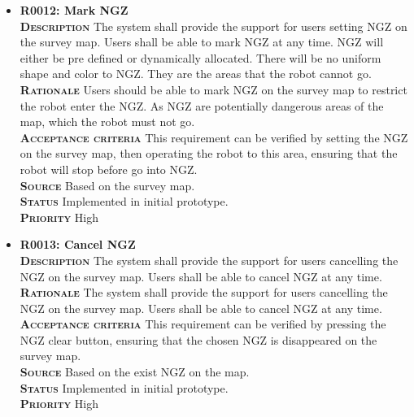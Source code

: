 \documentclass[11pt, a4paper]{article}
\begin{document}
\begin{itemize}
\item {\bfseries R0012: Mark NGZ}\\
\textsc{\bfseries Description} The system shall provide the support for users setting NGZ on the survey map. Users shall be able to mark NGZ at any time. NGZ will either be pre defined or dynamically allocated. There will be no uniform shape and color to NGZ. They are the areas that the robot cannot go. \\
\textsc{\bfseries Rationale} Users should be able to mark NGZ on the survey map to restrict the robot enter the NGZ. As NGZ are potentially dangerous areas of the map, which the robot must not go.\\
\textsc{\bfseries Acceptance criteria} This requirement can be verified by setting the NGZ on the survey map, then operating the robot to this area, ensuring that the robot will stop before go into NGZ.\\
\textsc{\bfseries Source} Based on the survey map.\\
\textsc{\bfseries Status} Implemented in initial prototype.\\
\textsc{\bfseries Priority} High\\

\item {\bfseries R0013: Cancel NGZ}\\
\textsc{\bfseries Description} The system shall provide the support for users cancelling the NGZ on the survey map. Users shall be able to cancel NGZ at any time.\\
\textsc{\bfseries Rationale} The system shall provide the support for users cancelling the NGZ on the survey map. Users shall be able to cancel NGZ at any time.\\
\textsc{\bfseries Acceptance criteria} This requirement can be verified by pressing the NGZ clear button, ensuring that the chosen NGZ is disappeared on the survey map.\\
\textsc{\bfseries Source} Based on the exist NGZ on the map.\\
\textsc{\bfseries Status} Implemented in initial prototype.\\
\textsc{\bfseries Priority} High\\
\end{itemize}
\end{document}
